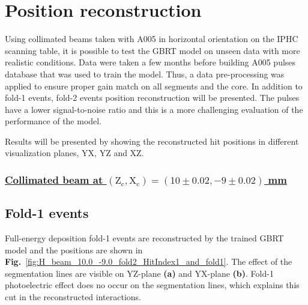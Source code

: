 \section{Position reconstruction}
\label{sec:position_reconstruction}
Using collimated beams taken with A005 in horizontal orientation on the IPHC scanning table, it is possible to test the GBRT model on unseen data with more realistic conditions. Data were taken a few months before building A005 pulses database that was used to train the model. Thus, a data pre-processing was applied to ensure proper gain match on all segments and the core. In addition to fold-1 events, fold-2 events position reconstruction will be presented. The pulses have a lower signal-to-noise ratio and this is a more challenging evaluation of the performance of the model.

Results will be presented by showing the reconstructed hit positions in different visualization planes, YX, YZ and XZ.

\subsubsection*{\underline{Collimated beam at $(\text{Z}_\text{c}, \text{X}_\text{c})= (10\pm0.02, -9\pm0.02)$ mm}}
\subsection{Fold-1 events}

Full-energy deposition fold-1 events are reconstructed by the trained GBRT model and the positions are shown in \textbf{Fig.}~\ref{fig:H_beam_10.0_-9.0_fold2_HitIndex1_and_fold1}. The effect of the segmentation lines are visible on YZ-plane \textbf{(a)} and YX-plane \textbf{(b)}. Fold-1 photoelectric effect does no occur on the segmentation lines, which explains this cut in the reconstructed interactions. 


